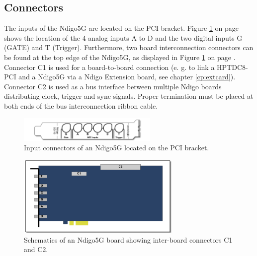 	\subsection{Connectors}
		The inputs of the Ndigo5G are located on the PCI bracket. Figure \ref{fig:schematics} on page \pageref{fig:schematics} shows the location of the 4 analog inputs A to D and the two digital inputs G (GATE) and T (Trigger). Furthermore, two board interconnection connectors can be found at the top edge of the Ndigo5G, as displayed in  Figure \ref{fig:schematics} on page \pageref{fig:schematics}. Connector C1 is used for a board-to-board connection (e. g. to link a HPTDC8-PCI and a Ndigo5G via a Ndigo Extension board, see chapter \ref{cp:extcard}). Connector C2 is used as a bus interface between multiple Ndigo boards distributing clock, trigger and sync signals. Proper termination must be placed at both ends of the bus interconnection ribbon cable.	
	\begin{figure}[hb]
		\begin{center}
			\includegraphics[width=0.6\textwidth]{figures/Ndigo-Slotblende.pdf}
			\caption{Input connectors of an Ndigo5G located on the PCI bracket.}
		\end{center}
	\end{figure}
	\begin{figure}[ht]
		\begin{center}
			\includegraphics[width=0.7\textwidth]{figures/Ndigo_schematic.pdf}
			\caption{Schematics of an Ndigo5G board showing inter-board connectors C1 and C2.\label{fig:schematics}}
		\end{center}
	\end{figure}
%
